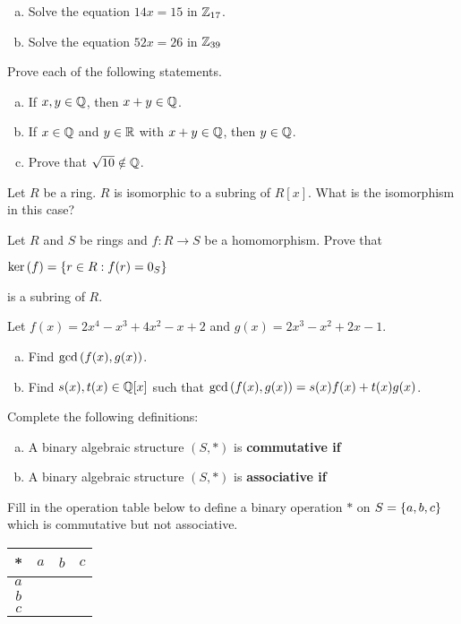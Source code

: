 \documentclass[11pt]{exam}
\begin{document}
\begin{questions}
\begin{enumerate}[(a)]
\item Solve the equation $14x = 15$ in $\mathbb{Z}_{17}$.
\vfill

\item Solve the equation $52x = 26$ in $\mathbb{Z}_{39}$
\vfill

\end{enumerate}
\newpage

\question[5] Prove each of the following statements.
\begin{enumerate}[(a)]
\item If $x,y\in\mathbb{Q}$, then $x+y\in\mathbb{Q}$.
\vfill

\item If $x\in \mathbb{Q}$ and $y\in\mathbb{R}$ with $x+y\in\mathbb{Q}$, then $y\in\mathbb{Q}$.
\vfill

\item Prove that $\sqrt{10}\notin\mathbb{Q}$.
\vfill

\end{enumerate}
\newpage

\question[2] Let $R$ be a ring.  $R$ is isomorphic to a subring of $R[x]$.  What is the isomorphism in this case?
\vspace{5cm}

\question[3] Let $R$ and $S$ be rings and $f:R\to S$ be a homomorphism.  Prove that
\begin{center}
$\text{ker}\left(f\right) = \left\{r\in R:f(r) = 0_{S}\right\}$
\end{center}
is a subring of $R$.
\vfill
\newpage

\question[5] Let $f(x) = 2x^4 - x^3 + 4x^2 - x + 2$ and $g(x) = 2x^3 - x^2 + 2x - 1$.
\begin{enumerate}[(a)]
\item Find $\text{gcd}\left(f(x),g(x)\right)$.
\vfill

\item Find $s(x),t(x)\in\mathbb{Q}[x]$ such that $\text{gcd}\left(f(x),g(x)\right) = s(x)f(x) + t(x)g(x)$.
\vfill
\end{enumerate}
\newpage

\question[1] Complete the following definitions:
\begin{enumerate}[(a)]
\item A binary algebraic structure $(S,*)$ is \bf commutative \md if
\vspace{2cm}

\item A binary algebraic structure $(S,*)$ is \bf associative \md if
\vspace{2cm}
\end{enumerate}

\question[2] Fill in the operation table below to define a binary operation $*$ on $S = \left\{a,b,c\right\}$ which is commutative but not associative.
\bgroup
\begin{center}
\def\arraystretch{1.5}
\begin{tabular}{c|ccc}
* & $a$ & $b$ & $c$\\
\hline
$a$ &\\
$b$ &\\
$c$ &\\
\end{tabular}
\end{center}
\egroup

\end{questions}
\end{document}
